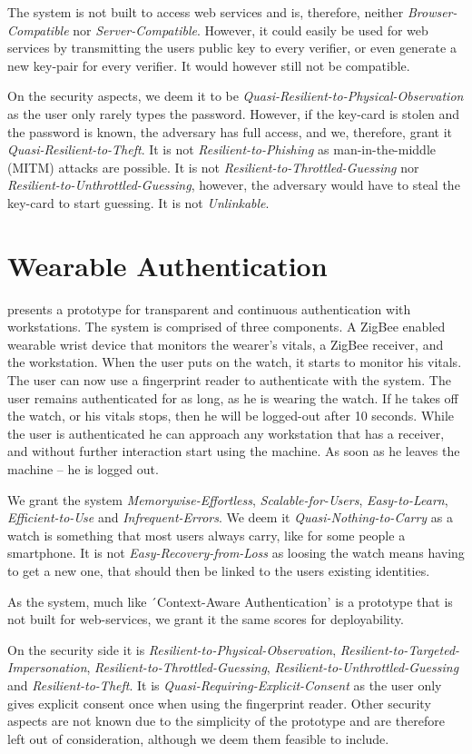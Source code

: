 The system is not built to access web services and is, therefore, neither \textit{Browser-Compatible} nor \textit{Server-Compatible}.
However, it could easily be used for web services by transmitting the users public key to every verifier, or even generate a new key-pair for every verifier. It would however still not be compatible.

On the security aspects, we deem it to be \textit{Quasi-Resilient-to-Physical-Observation} as the user only rarely types the password.
However, if the key-card is stolen and the password is known, the adversary has full access, and we, therefore, grant it \textit{Quasi-Resilient-to-Theft}.
It is not \textit{Resilient-to-Phishing} as man-in-the-middle (MITM) attacks are possible.
It is not  \textit{Resilient-to-Throttled-Guessing} nor \textit{Resilient-to-Unthrottled-Guessing}, however, the adversary would have to steal the key-card to start guessing. It is not \textit{Unlinkable}.


\section{Wearable Authentication}
\citet{ojala2008wearable} presents a prototype for transparent and continuous authentication with workstations. The system is comprised of three components. A ZigBee enabled wearable wrist device that monitors the wearer's vitals, a ZigBee receiver, and the workstation. When the user puts on the watch, it starts to monitor his vitals. The user can now use a fingerprint reader to authenticate with the system. The user remains authenticated for as long, as he is wearing the watch. If he takes off the watch, or his vitals stops, then he will be logged-out after 10 seconds. While the user is authenticated he can approach any workstation that has a receiver, and without further interaction start using the machine. As soon as he leaves the machine -- he is logged out.

We grant the system \textit{Memorywise-Effortless}, \textit{Scalable-for-Users}, \textit{Easy-to-Learn}, \textit{Efficient-to-Use} and \textit{Infrequent-Errors}. We deem it \textit{Quasi-Noth\-ing-to-Carry} as a watch is something that most users always carry, like for some people a smartphone. It is not \textit{Easy-Recovery-from-Loss} as loosing the watch means having to get a new one, that should then be linked to the users existing identities.

As the system, much like ´Context-Aware Authentication' \cite{bardram2003context} is a prototype that is not built for web-services, we grant it the same scores for deployability. 

On the security side it is \textit{Resilient-to-Physical-Observation}, \textit{Resilient-to-Targeted-Impersonation}, \textit{Resilient-to-Throttled-Guessing}, \textit{Resilient-to-Un\-throttled-Guessing} and \textit{Resilient-to-Theft}. It is \textit{Quasi-Requiring-Explicit-Consent} as the user only gives explicit consent once when using the fingerprint reader.
Other security aspects are not known due to the simplicity of the prototype and are therefore left out of consideration, although we deem them feasible to include.

